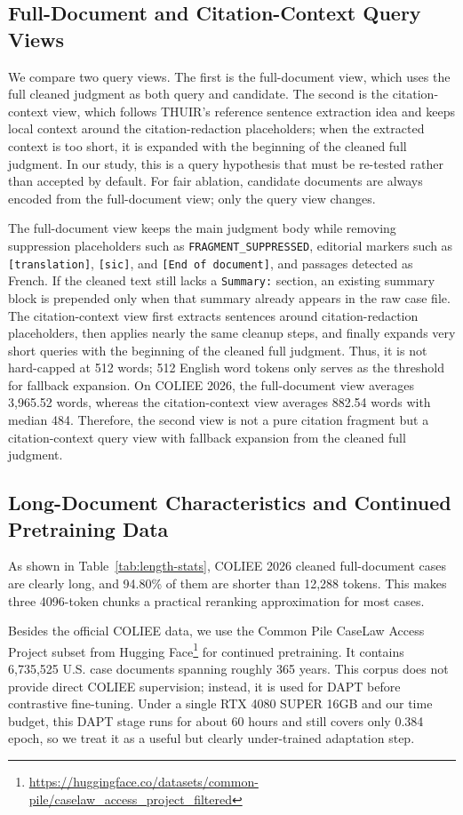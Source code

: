 \subsection{Full-Document and Citation-Context Query Views}

We compare two query views. The first is the full-document view, which uses the full cleaned judgment as both query and candidate. The second is the citation-context view, which follows THUIR's reference sentence extraction idea and keeps local context around the citation-redaction placeholders; when the extracted context is too short, it is expanded with the beginning of the cleaned full judgment. In our study, this is a query hypothesis that must be re-tested rather than accepted by default. For fair ablation, candidate documents are always encoded from the full-document view; only the query view changes.

The full-document view keeps the main judgment body while removing suppression placeholders such as \texttt{FRAGMENT\_SUPPRESSED}, editorial markers such as \texttt{[translation]}, \texttt{[sic]}, and \texttt{[End of document]}, and passages detected as French. If the cleaned text still lacks a \texttt{Summary:} section, an existing summary block is prepended only when that summary already appears in the raw case file. The citation-context view first extracts sentences around citation-redaction placeholders, then applies nearly the same cleanup steps, and finally expands very short queries with the beginning of the cleaned full judgment. Thus, it is not hard-capped at 512 words; 512 English word tokens only serves as the threshold for fallback expansion. On COLIEE 2026, the full-document view averages 3,965.52 words, whereas the citation-context view averages 882.54 words with median 484. Therefore, the second view is not a pure citation fragment but a citation-context query view with fallback expansion from the cleaned full judgment.

\subsection{Long-Document Characteristics and Continued Pretraining Data}

As shown in Table~\ref{tab:length-stats}, COLIEE 2026 cleaned full-document cases are clearly long, and 94.80\% of them are shorter than 12,288 tokens. This makes three 4096-token chunks a practical reranking approximation for most cases.

Besides the official COLIEE data, we use the Common Pile CaseLaw Access Project subset from Hugging Face\footnote{\url{https://huggingface.co/datasets/common-pile/caselaw_access_project_filtered}} for continued pretraining. It contains 6,735,525 U.S. case documents spanning roughly 365 years. This corpus does not provide direct COLIEE supervision; instead, it is used for DAPT before contrastive fine-tuning. Under a single RTX 4080 SUPER 16GB and our time budget, this DAPT stage runs for about 60 hours and still covers only 0.384 epoch, so we treat it as a useful but clearly under-trained adaptation step.
